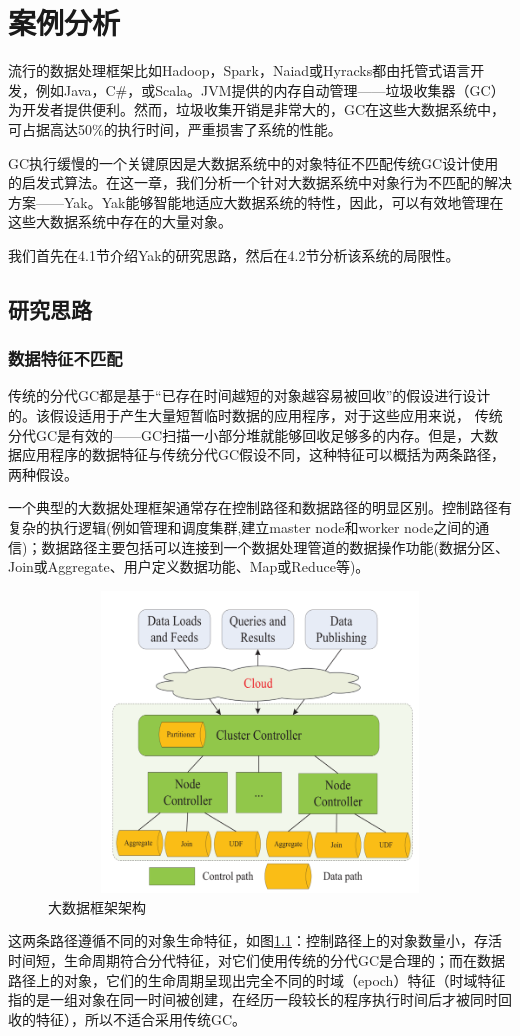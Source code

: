 
\chapter{案例分析}
流行的数据处理框架比如Hadoop，Spark，Naiad或Hyracks都由托管式语言开发，例如Java，C\#，或Scala。JVM提供的内存自动管理——垃圾收集器（GC）为开发者提供便利。然而，垃圾收集开销是非常大的，GC在这些大数据系统中，可占据高达50\%的执行时间，严重损害了系统的性能。

GC执行缓慢的一个关键原因是大数据系统中的对象特征不匹配传统GC设计使用的启发式算法。在这一章，我们分析一个针对大数据系统中对象行为不匹配的解决方案——Yak。Yak能够智能地适应大数据系统的特性，因此，可以有效地管理在这些大数据系统中存在的大量对象。

我们首先在4.1节介绍Yak的研究思路，然后在4.2节分析该系统的局限性。


\section{研究思路}
\subsection{数据特征不匹配}

传统的分代GC都是基于“已存在时间越短的对象越容易被回收”的假设进行设计的。该假设适用于产生大量短暂临时数据的应用程序，对于这些应用来说， 传统分代GC是有效的——GC扫描一小部分堆就能够回收足够多的内存。但是，大数据应用程序的数据特征与传统分代GC假设不同，这种特征可以概括为两条路径，两种假设。

一个典型的大数据处理框架通常存在控制路径和数据路径的明显区别。控制路径有复杂的执行逻辑(例如管理和调度集群,建立master node和worker node之间的通信)；数据路径主要包括可以连接到一个数据处理管道的数据操作功能(数据分区、Join或Aggregate、用户定义数据功能、Map或Reduce等)。
\begin{figure}[h]
    \centering
    \includegraphics[width=12cm,height=8cm]{figure/two_Path.png}
    \caption{大数据框架架构}
    \label{img1}
\end{figure}
这两条路径遵循不同的对象生命特征，如图\ref{img1}：控制路径上的对象数量小，存活时间短，生命周期符合分代特征，对它们使用传统的分代GC是合理的；而在数据路径上的对象，它们的生命周期呈现出完全不同的时域（epoch）特征（时域特征指的是一组对象在同一时间被创建，在经历一段较长的程序执行时间后才被同时回收的特征），所以不适合采用传统GC。


